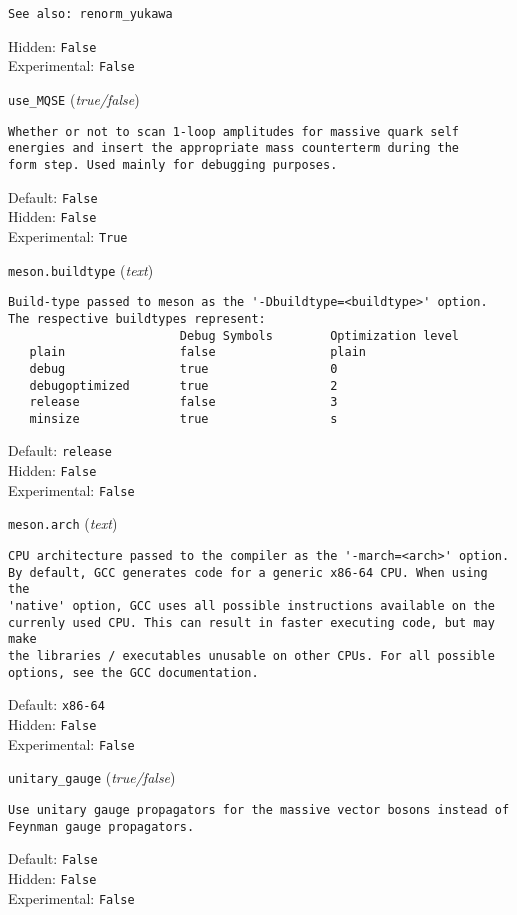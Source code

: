 \begin{basedescript}{\desclabelstyle{\pushlabel}}
\begin{verbatim}
See also: renorm_yukawa
\end{verbatim}
Hidden: \verb|False|
\\Experimental: \verb|False|
\\\item[\colorbox{gray!30}{\texttt{use\_MQSE}}] (\textit{true/false})
\begin{verbatim}
Whether or not to scan 1-loop amplitudes for massive quark self
energies and insert the appropriate mass counterterm during the
form step. Used mainly for debugging purposes.
\end{verbatim}
Default: \verb|False|
\\Hidden: \verb|False|
\\Experimental: \verb|True|
\\\item[\colorbox{gray!30}{\texttt{meson.buildtype}}] (\textit{text})
\begin{verbatim}
Build-type passed to meson as the '-Dbuildtype=<buildtype>' option.
The respective buildtypes represent:
                        Debug Symbols        Optimization level
   plain                false                plain
   debug                true                 0
   debugoptimized       true                 2
   release              false                3
   minsize              true                 s
\end{verbatim}
Default: \verb|release|
\\Hidden: \verb|False|
\\Experimental: \verb|False|
\\\item[\colorbox{gray!30}{\texttt{meson.arch}}] (\textit{text})
\begin{verbatim}
CPU architecture passed to the compiler as the '-march=<arch>' option.
By default, GCC generates code for a generic x86-64 CPU. When using the
'native' option, GCC uses all possible instructions available on the
currenly used CPU. This can result in faster executing code, but may make
the libraries / executables unusable on other CPUs. For all possible
options, see the GCC documentation.
\end{verbatim}
Default: \verb|x86-64|
\\Hidden: \verb|False|
\\Experimental: \verb|False|
\\\item[\colorbox{gray!30}{\texttt{unitary\_gauge}}] (\textit{true/false})
\begin{verbatim}
Use unitary gauge propagators for the massive vector bosons instead of
Feynman gauge propagators.
\end{verbatim}
Default: \verb|False|
\\Hidden: \verb|False|
\\Experimental: \verb|False|
\\\end{basedescript}
